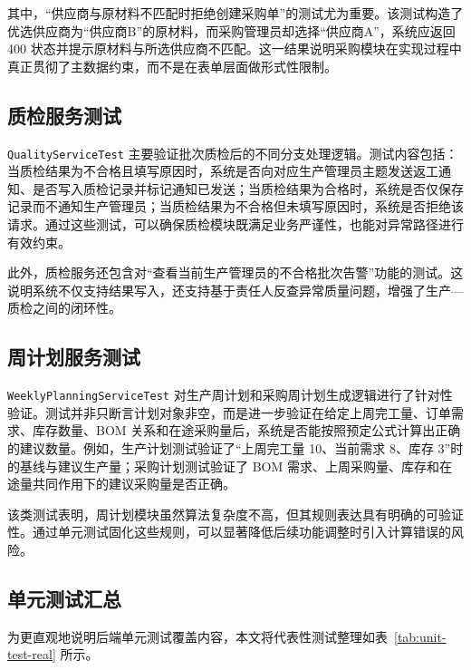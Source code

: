 其中，“供应商与原材料不匹配时拒绝创建采购单”的测试尤为重要。该测试构造了优选供应商为“供应商B”的原材料，而采购管理员却选择“供应商A”，系统应返回 400 状态并提示原材料与所选供应商不匹配。这一结果说明采购模块在实现过程中真正贯彻了主数据约束，而不是在表单层面做形式性限制。

\subsection{质检服务测试}

\texttt{QualityServiceTest} 主要验证批次质检后的不同分支处理逻辑。测试内容包括：当质检结果为不合格且填写原因时，系统是否向对应生产管理员主题发送返工通知、是否写入质检记录并标记通知已发送；当质检结果为合格时，系统是否仅保存记录而不通知生产管理员；当质检结果为不合格但未填写原因时，系统是否拒绝该请求。通过这些测试，可以确保质检模块既满足业务严谨性，也能对异常路径进行有效约束。

此外，质检服务还包含对“查看当前生产管理员的不合格批次告警”功能的测试。这说明系统不仅支持结果写入，还支持基于责任人反查异常质量问题，增强了生产—质检之间的闭环性。

\subsection{周计划服务测试}

\texttt{WeeklyPlanningServiceTest} 对生产周计划和采购周计划生成逻辑进行了针对性验证。测试并非只断言计划对象非空，而是进一步验证在给定上周完工量、订单需求、库存数量、BOM 关系和在途采购量后，系统是否能按照预定公式计算出正确的建议数量。例如，生产计划测试验证了“上周完工量 10、当前需求 8、库存 3”时的基线与建议生产量；采购计划测试验证了 BOM 需求、上周采购量、库存和在途量共同作用下的建议采购量是否正确。

该类测试表明，周计划模块虽然算法复杂度不高，但其规则表达具有明确的可验证性。通过单元测试固化这些规则，可以显著降低后续功能调整时引入计算错误的风险。

\subsection{单元测试汇总}

为更直观地说明后端单元测试覆盖内容，本文将代表性测试整理如表~\ref{tab:unit-test-real} 所示。

